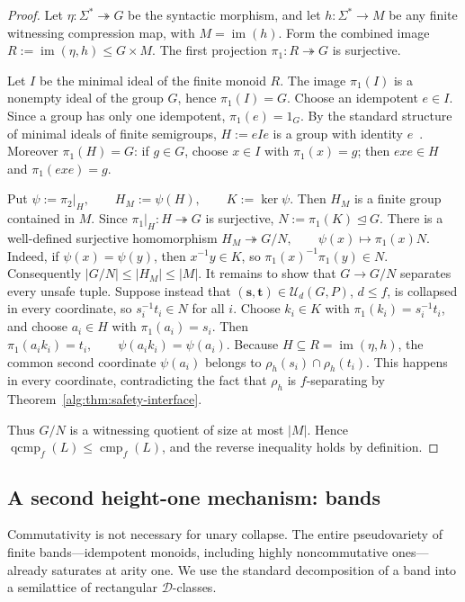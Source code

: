 \documentclass[10pt,a4paper]{article}
\theoremstyle{definition}
\theoremstyle{remark}
\newcommand{\cmp}{\operatorname{cmp}}
\newcommand{\qcmp}{\operatorname{qcmp}}
\begin{document}
\begin{proof}
Let \(\eta:\Sigma^*\twoheadrightarrow G\) be the syntactic morphism, and let
\(h:\Sigma^*\to M\) be any finite witnessing compression map, with
\(M=\operatorname{im}(h)\). Form the combined image
\(R:=\operatorname{im}(\eta,h)\le G\times M.\)
The first projection \(\pi_1:R\twoheadrightarrow G\) is surjective.

Let \(I\) be the minimal ideal of the finite monoid \(R\). The image
\(\pi_1(I)\) is a nonempty ideal of the group \(G\), hence
\(\pi_1(I)=G\). Choose an idempotent \(e\in I\). Since a group has only
one idempotent, \(\pi_1(e)=1_G\). By the standard structure of minimal
ideals of finite semigroups, \(H:=eIe\) is a group with identity
\(e\)~\cite{Howie1995}. Moreover \(\pi_1(H)=G\): if \(g\in G\), choose
\(x\in I\) with \(\pi_1(x)=g\); then \(exe\in H\) and
\(\pi_1(exe)=g\).

Put
\(\psi:=\pi_2|_H, \qquad H_M:=\psi(H), \qquad K:=\ker\psi.\)
Then \(H_M\) is a finite group contained in \(M\). Since
\(\pi_1|_H:H\twoheadrightarrow G\) is surjective, \(N:=\pi_1(K)\trianglelefteq G.\) There is a well-defined surjective homomorphism
\(H_M\twoheadrightarrow G/N, \qquad \psi(x)\longmapsto \pi_1(x)N.\)
Indeed, if \(\psi(x)=\psi(y)\), then \(x^{-1}y\in K\), so
\(\pi_1(x)^{-1}\pi_1(y)\in N\). Consequently \(|G/N|\le |H_M|\le |M|.\) It remains to show that \(G\to G/N\) separates every unsafe tuple. Suppose
instead that \((\mathbf s,\mathbf t)\in\mathcal U_d(G,P)\), \(d\le f\), is
collapsed in every coordinate, so \(s_i^{-1}t_i\in N\) for all \(i\).
Choose \(k_i\in K\) with \(\pi_1(k_i)=s_i^{-1}t_i\), and choose
\(a_i\in H\) with \(\pi_1(a_i)=s_i\). Then \(\pi_1(a_ik_i)=t_i, \qquad \psi(a_ik_i)=\psi(a_i).\) Because \(H\subseteq R=\operatorname{im}(\eta,h)\), the common second
coordinate \(\psi(a_i)\) belongs to
\(\rho_h(s_i)\cap\rho_h(t_i)\). This happens in every coordinate,
contradicting the fact that \(\rho_h\) is \(f\)-separating by
Theorem~\ref{alg:thm:safety-interface}.

Thus \(G/N\) is a witnessing quotient of size at most \(|M|\). Hence
\(\qcmp_f(L)\le\cmp_f(L)\), and the reverse inequality holds by definition.
\end{proof}

\subsection{A second height-one mechanism: bands}

Commutativity is not necessary for unary collapse.  The entire pseudovariety
of finite bands---idempotent monoids, including highly noncommutative
ones---already saturates at arity one.  We use the standard decomposition of
a band into a semilattice of rectangular \(\mathcal D\)-classes.
\end{document}
